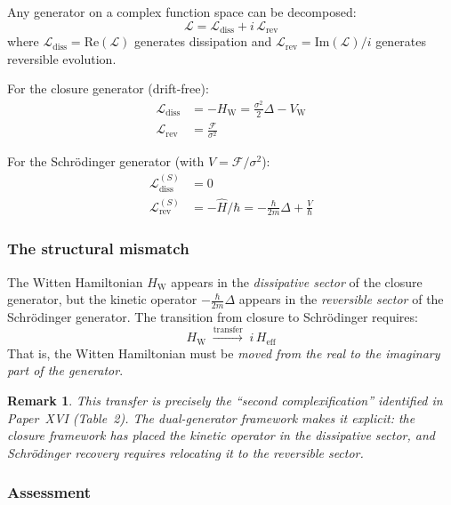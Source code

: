 \documentclass[12pt]{article}
\newtheorem{remark}[theorem]{Remark}
\newcommand{\Fcal}{\mathcal{F}}
\newcommand{\Lcal}{\mathcal{L}}
\begin{document}
Any generator on a complex function space can be decomposed:
\begin{equation}\label{eq:dual}
    \Lcal = \Lcal_{\mathrm{diss}} + i\,\Lcal_{\mathrm{rev}}
\end{equation}
where $\Lcal_{\mathrm{diss}} = \mathrm{Re}(\Lcal)$ generates dissipation and $\Lcal_{\mathrm{rev}} = \mathrm{Im}(\Lcal)/i$ generates reversible evolution.

For the closure generator (drift-free):
\begin{align}
    \Lcal_{\mathrm{diss}} &= -H_{\mathrm{W}} = \frac{\sigma^2}{2}\Delta - V_{\mathrm{W}} \label{eq:diss_sector}\\
    \Lcal_{\mathrm{rev}} &= \frac{\Fcal}{\sigma^2} \label{eq:rev_sector}
\end{align}

For the Schr\"odinger generator (with $V = \Fcal/\sigma^2$):
\begin{align}
    \Lcal_{\mathrm{diss}}^{(S)} &= 0 \\
    \Lcal_{\mathrm{rev}}^{(S)} &= -\hat{H}/\hbar = -\frac{\hbar}{2m}\Delta + \frac{V}{\hbar}
\end{align}

\subsubsection*{The structural mismatch}

The Witten Hamiltonian $H_{\mathrm{W}}$ appears in the \textit{dissipative sector} of the closure generator, but the kinetic operator $-\frac{\hbar}{2m}\Delta$ appears in the \textit{reversible sector} of the Schr\"odinger generator. The transition from closure to Schr\"odinger requires:
\begin{equation}\label{eq:transfer}
    H_{\mathrm{W}} \;\xrightarrow{\text{transfer}}\; i\,H_{\mathrm{eff}}
\end{equation}
That is, the Witten Hamiltonian must be \textit{moved from the real to the imaginary part of the generator}.

\begin{remark}
This transfer is precisely the ``second complexification'' identified in Paper~XVI (Table~2). The dual-generator framework makes it explicit: the closure framework has placed the kinetic operator in the dissipative sector, and Schr\"odinger recovery requires relocating it to the reversible sector.
\end{remark}

\subsubsection*{Assessment}
\end{document}
